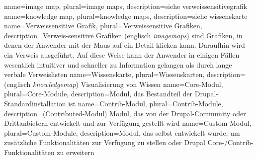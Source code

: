 {
	name=image map,
	plural=image maps,
	description={siehe \gls{verweissensitivegrafik}}
}
{
	name=knowledge map,
	plural=knowledge maps,
	description={siehe \gls{wissenskarte}}
}
{
	name=Verweissensitive Grafik,
	plural=Verweissensitive Grafiken,
	description={Verweis-sensitive Grafiken (englisch \textit{\glspl{imagemap}}) sind Grafiken, in denen der Anwender mit der Maus auf ein Detail klicken kann. Daraufhin wird ein Verweis ausgeführt. Auf diese Weise kann der Anwender in einigen Fällen wesentlich intuitiver und schneller zu Information gelangen als durch lange verbale Verweislisten}
}
{
	name=Wissenskarte,
	plural=Wissenskarten,
	description={(englisch \textit{\gls{knowledgemap}}) Visualisierung von Wissen}
}
{
	name=Core-Modul,
	plural=Core-Module,
	description={Modul, das Bestandteil der Drupal-Standardinstallation ist}
}
{
	name=Contrib-Modul,
	plural=Contrib-Module,
	description={(Contributed-Modul) Modul, das von der Drupal-Community oder Drittanbietern entwickelt und zur Verfügung gestellt wird}
}
{
	name=Custom-Modul,
	plural=Custom-Module,
	description={Modul, das selbst entwickelt wurde, um zusätzliche Funktionalitäten zur Verfügung zu stellen oder Drupal Core-/Contrib-Funktionalitäten zu erweitern}
}







%
%

